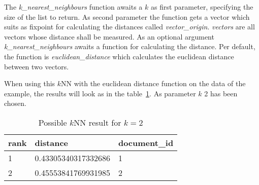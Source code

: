 The \textit{k\_nearest\_neighbours} function awaits a $k$ as first parameter, specifying the size of the list to return.
As second parameter the function gets a vector which suits as fixpoint for calculating the distances called \textit{vector\_origin}.
\textit{vectors} are all vectors whose distance shall be measured.
As an optional argument \textit{k\_nearest\_neighbours} awaits a function for calculating the distance.
Per default, the function is \textit{euclidean\_distance} which calculates the euclidean distance between two vectors.

When using this $k$NN with the euclidean distance function on the data of the example, the results will look as in the table~\ref{tab:knn-result}.
As parameter $k$ 2 has been chosen.



\begin{table}
    \center
    \begin{tabular}{ l | l | l }
        \rowcolor{\dustRowHead}
        rank    & distance              & document\_id\\\hline
        1       & 0.43305340317332686   & 1\\
        2       & 0.45553841769931985   & 2\\
    \end{tabular}
    \caption{Possible $k$NN result for $k=2$}
    \label{tab:knn-result}
\end{table}







